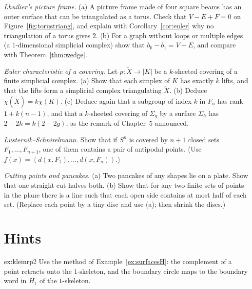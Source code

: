 \begin{exercise}[$\star$]\label{ex:lhuilier}
\emph{Lhuilier's picture frame.} (a) A picture frame made of four square beams has an outer surface that can be triangulated as a torus. Check that $V-E+F=0$ on Figure~\ref{fig:torustriang}, and explain
with Corollary~\ref{cor:euler} why no triangulation of a torus gives $2$. (b) For a graph without loops or multiple edges (a $1$-dimensional simplicial complex) show that $b_0-b_1=V-E$, and compare with
Theorem~\ref{thm:wedge}.
\end{exercise}

\begin{exercise}[$\star\star$]\label{ex:coveringchi}
\emph{Euler characteristic of a covering.} Let $p\colon\tilde X\to|K|$ be a $k$-sheeted covering of a finite simplicial complex. (a) Show that each simplex of $K$ has exactly $k$ lifts, and that the lifts form a simplicial
complex triangulating $\tilde X$. (b) Deduce $\chi(\tilde X)=k\chi(K)$. (c) Deduce again that a subgroup of index $k$ in $F_n$ has rank $1+k(n-1)$, and that a $k$-sheeted covering of $\Sigma_g$ by a surface $\Sigma_h$ has
$2-2h=k(2-2g)$, as the remark of Chapter~5 announced.
\end{exercise}

\begin{exercise}[$\star\star$]\label{ex:lusternik}
\emph{Lusternik--Schnirelmann.} Show that if $S^n$ is covered by $n+1$ closed sets $F_1,\dots,F_{n+1}$, one of them contains a pair of antipodal points. (Use $f(x)=(d(x,F_1),\dots,d(x,F_n))$.)
\end{exercise}

\begin{exercise}[$\star$]\label{ex:pancakes}
\emph{Cutting points and pancakes.} (a) Two pancakes of any shapes lie on a plate. Show that one straight cut halves both. (b) Show that for any two finite sets of points in the plane there is a line such
that each open side contains at most half of each set. (Replace each point by a tiny disc and use (a); then shrink the discs.)
\end{exercise}

\section{Hints}

\begin{hint}{ex:kleinrp2}
Use the method of Example~\ref{ex:surfacesH}: the complement of a point retracts onto the $1$-skeleton, and the boundary circle maps to the boundary word in $H_1$ of the $1$-skeleton.
\end{hint}

